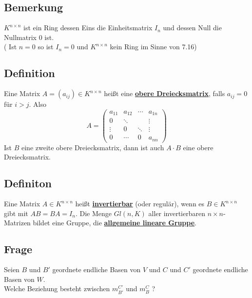 \subsection{Bemerkung} %
\label{sub:bemerkung}
$K^{n \times n}$ ist ein Ring dessen Eins die Einheitsmatrix $I_n$ und dessen Null die Nullmatrix $0$ ist. \\
( Ist $n=0$ so ist $I_n=0$ und $K^{n \times n}$ kein Ring im Sinne von 7.16)

\subsection{Definition} %
\label{sub:definition}
Eine Matrix $A= (a_{ij}) \in K^{n \times n}$ heißt eine \underline{\textbf{obere Dreiecksmatrix}}, falls $a_{ij}=0$ für $i > j$. Also
\[
	A= \begin{pmatrix}
		a_{11} & a_{12} & \cdots & a_{1n} \\
		0 & \ddots & & \vdots \\
		\vdots & 0 & \ddots & \vdots \\
		0 & \cdots & 0 & a_{nn}
	\end{pmatrix}
\]
Ist $B$ eine zweite obere Dreiecksmatrix, dann ist auch $A \cdot B$ eine obere Dreiecksmatrix.

\subsection{Definiton} %
\label{sub:definiton}
Eine Matrix $A \in K^{n \times n}$ heißt \underline{\textbf{invertierbar}} (oder regulär), wenn es $B \in K^{n \times n}$ gibt mit $AB=BA=I_n$. Die Menge
$Gl(n,K)$ aller invertierbaren \(n \times n \)-Matrizen bildet eine Gruppe, die \underline{\textbf{allgemeine lineare Gruppe}}.

\subsection{Frage} %
\label{sub:frage}
Seien $B$ und $B'$ geordnete endliche Basen von $V$ und $C$ und $C'$ geordnete endliche Basen von $W$. \\
Welche Beziehung besteht zwischen $m_{B'}^{C'}$ und $m_{B}^{C}$ ?


